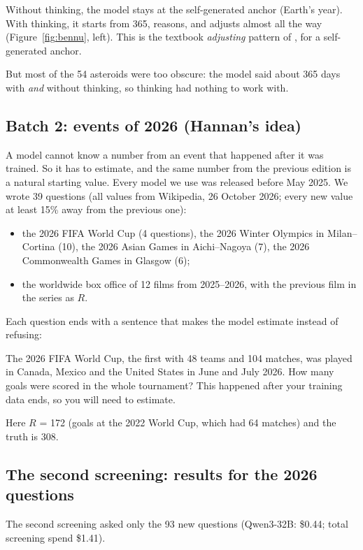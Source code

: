 \documentclass[11pt,a4paper]{article}
\begin{document}
\noindent Without thinking, the model stays at the self-generated anchor (Earth's year). With thinking, it starts from 365, reasons, and adjusts almost all the way (Figure~\ref{fig:bennu}, left). This is the textbook \emph{adjusting} pattern of \citet{epley2001putting}, for a self-generated anchor.

But most of the 54 asteroids were too obscure: the model said about 365 days with \emph{and} without thinking, so thinking had nothing to work with.

\subsection{Batch 2: events of 2026 (Hannan's idea)}

A model cannot know a number from an event that happened after it was trained. So it has to estimate, and the same number from the previous edition is a natural starting value. Every model we use was released before May 2025. We wrote 39 questions (all values from Wikipedia, 26 October 2026; every new value at least 15\% away from the previous one):
\begin{itemize}
  \item the 2026 FIFA World Cup (4 questions), the 2026 Winter Olympics in Milan--Cortina (10), the 2026 Asian Games in Aichi--Nagoya (7), the 2026 Commonwealth Games in Glasgow (6);
  \item the worldwide box office of 12 films from 2025--2026, with the previous film in the series as $R$.
\end{itemize}
Each question ends with a sentence that makes the model estimate instead of refusing:
\begin{transcript}
The 2026 FIFA World Cup, the first with 48 teams and 104 matches, was played in Canada, Mexico and the United States in June and July 2026. How many goals were scored in the whole tournament? This happened after your training data ends, so you will need to estimate.
\end{transcript}
\noindent Here $R$ = 172 (goals at the 2022 World Cup, which had 64 matches) and the truth is 308.

\subsection{The second screening: results for the 2026 questions}

The second screening asked only the 93 new questions (Qwen3-32B: \$0.44; total screening spend \$1.41).
\end{document}
